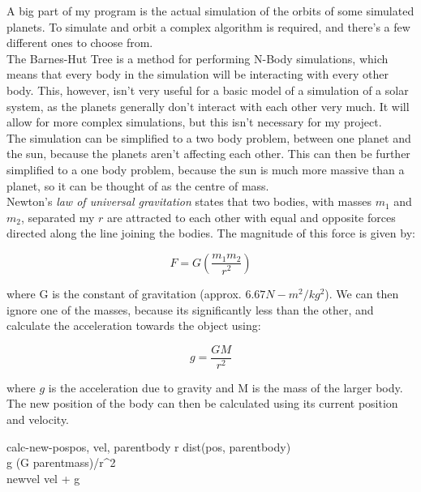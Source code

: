 A big part of my program is the actual simulation of the orbits of some
simulated planets. To simulate and orbit a complex algorithm is required, and
there's a few different ones to choose from. \\

The Barnes-Hut Tree is a method for performing N-Body simulations, which means
that every body in the simulation will be interacting with every other body.
This, however, isn't very useful for a basic model of a simulation of a solar
system, as the planets generally don't interact with each other very much. It
will allow for more complex simulations, but this isn't necessary for my
project. \\

The simulation can be simplified to a two body problem, between one planet and
the sun, because the planets aren't affecting each other. This can then be
further simplified to a one body problem, because the sun is much more massive
than a planet, so it can be thought of as the centre of mass. \\

Newton's \emph{law of universal gravitation} states that two bodies, with masses
$m_1$ and $m_2$, separated my $r$ are attracted to each other with equal and
opposite forces directed along the line joining the bodies. The magnitude of
this force is given by:

\begin{equation}
	F = G (\frac{m_1 m_2}{r^2})	
\end{equation}

where G is the constant of gravitation (approx. $6.67 N-m^2/kg^2$). We can then
ignore one of the masses, because its significantly less than the other, and
calculate the acceleration towards the object using:

\begin{equation}
	g = \frac{GM}{r^2}
\end{equation}

where $g$ is the acceleration due to gravity and M is the mass of the larger
body. The new position of the body can then be calculated using its current
position and velocity.

\begin{pseudocode}{calc-new-pos}{pos, vel, parentbody}
	r \GETS dist(pos, parentbody)	 \\
	g \GETS (G \cdot parentmass)/r^2 \\
	newvel \GETS vel + g \\
\end{pseudocode}

